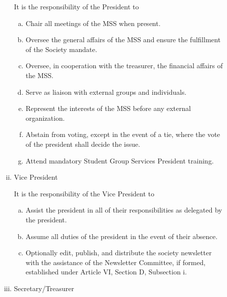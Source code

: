 \documentclass[11pt]{article}
\begin{document}
\begin{enumerate}[I.]
\begin{enumerate}[A)]
\begin{enumerate}[i)]
					It is the responsibility of the President to
						\begin{enumerate}[a)]
							\item Chair all meetings of the MSS when present. 
							\item  Oversee the general affairs of the MSS and ensure the fulfillment of the Society mandate. 
							\item Oversee, in cooperation with the treasurer, the financial affairs of the MSS. 
							\item Serve as liaison with external groups and individuals. 
							\item Represent the interests of the MSS before any external organization. 
							\item Abstain from voting, except in the event of a tie, where the vote of the president shall decide the issue.
							\item Attend mandatory Student Group Services President training.
					
						\end{enumerate}
					\item Vice President
					
					It is the responsibility of the Vice President to
						\begin{enumerate}[a)]
							\item Assist the president in all of their responsibilities as delegated by the president.
							\item Assume all duties of the president in the event of their absence. 
							\item Optionally edit, publish, and distribute the society newsletter with the assistance of the Newsletter Committee, if formed, established under Article VI, Section D, Subsection i.
						\end{enumerate}
					\item Secretary/Treasurer
					

\end{enumerate}
\end{enumerate}
\end{enumerate}
\end{document}
